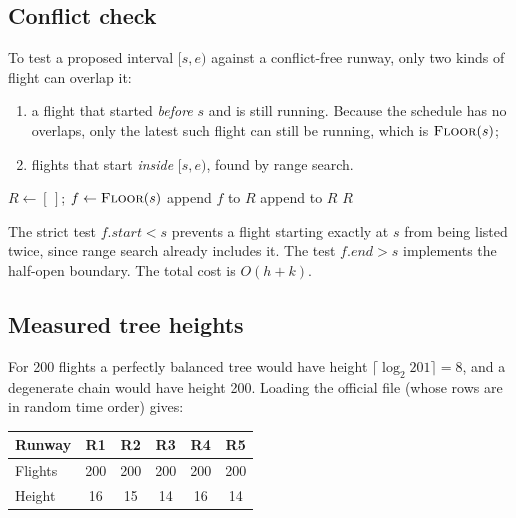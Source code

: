 \documentclass[11pt]{article}
\begin{document}
\subsection{Conflict check}
To test a proposed interval $[s, e)$ against a conflict-free runway, only two
kinds of flight can overlap it:
\begin{enumerate}
  \item a flight that started \emph{before} $s$ and is still running. Because the
  schedule has no overlaps, only the latest such flight can still be running,
  which is $\textsc{Floor}(s)$;
  \item flights that start \emph{inside} $[s, e)$, found by range search.
\end{enumerate}

\begin{algorithm}[ht]
\caption{Conflict check (matches \texttt{RunwayBST.conflicts})}
\begin{algorithmic}[1]
  \State $R \gets [\,]$; \quad $f \gets \Call{Floor}{s}$
    \State append $f$ to $R$
  \EndIf
  \State append  to $R$
  \State \Return $R$ 
\EndProcedure
\end{algorithmic}
\end{algorithm}

The strict test $f.\mathit{start} < s$ prevents a flight starting exactly at $s$
from being listed twice, since range search already includes it. The test
$f.\mathit{end} > s$ implements the half-open boundary. The total cost is
$O(h + k)$.

\subsection{Measured tree heights}
For 200 flights a perfectly balanced tree would have height
$\lceil \log_2 201 \rceil = 8$, and a degenerate chain would have height 200.
Loading the official file (whose rows are in random time order) gives:

\begin{center}
\begin{tabular}{@{}lccccc@{}}
\toprule
Runway & R1 & R2 & R3 & R4 & R5 \\
\midrule
Flights & 200 & 200 & 200 & 200 & 200 \\
Height  & 16 & 15 & 14 & 16 & 14 \\
\bottomrule
\end{tabular}
\end{center}
\end{document}
